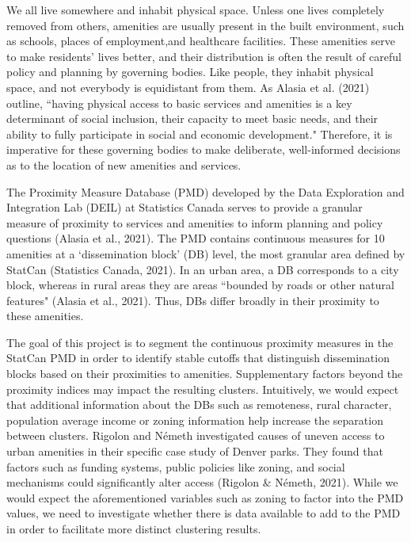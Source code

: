 \documentclass[11pt, a4paper]{article}
\begin{document}
We all live somewhere and inhabit physical space. Unless one lives completely removed from others, amenities are usually present in the built environment, such as schools, places of employment,and healthcare facilities. These amenities serve to make residents’ lives better, and their distribution is often the result of careful policy and planning by governing bodies. Like people, they inhabit physical space, and not everybody is equidistant from them. As Alasia et al. (2021) outline, ``having physical access to basic services and amenities is a key determinant of social inclusion, their capacity to meet basic needs, and their ability to fully participate in social and economic development." Therefore, it is imperative for these governing bodies to make deliberate, well-informed decisions as to the location of new amenities and services. 
\par
The Proximity Measure Database (PMD) developed by the Data Exploration and Integration Lab (DEIL) at Statistics Canada serves to provide a granular measure of proximity to services and amenities to inform planning and policy questions (Alasia et al., 2021). The PMD contains continuous measures for 10 amenities at a `dissemination block’ (DB) level, the most granular area defined by StatCan (Statistics Canada, 2021). In an urban area, a DB corresponds to a city block, whereas in rural areas they are areas “bounded by roads or other natural features" (Alasia et al., 2021). Thus, DBs differ broadly in their proximity to these amenities. 
\par
The goal of this project is to segment the continuous proximity measures in the StatCan PMD in order to identify stable cutoffs that distinguish dissemination blocks based on their proximities to amenities. Supplementary factors beyond the proximity indices may impact the resulting clusters. Intuitively, we would expect that additional information about the DBs such as remoteness, rural character, population average income or zoning information help increase the separation between clusters. Rigolon and Németh investigated causes of uneven access to urban amenities in their specific case study of Denver parks. They found that factors such as funding systems, public policies like zoning, and social mechanisms could significantly alter access (Rigolon \& Németh, 2021). While we would expect the aforementioned variables such as zoning to factor into the PMD values, we need to investigate whether there is data available to add to the PMD in order to facilitate more distinct clustering results.
\par
\end{document}

